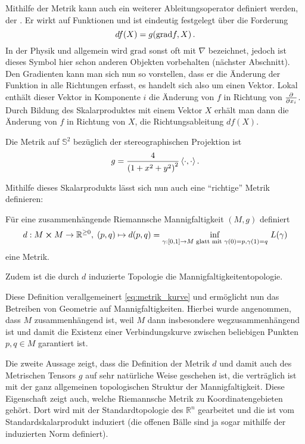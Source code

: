\documentclass[../H_Analysis_main.tex]{subfiles}
\begin{document}
\begin{bsp}[Gradient]
Mithilfe der Metrik kann auch ein weiterer Ableitungsoperator definiert werden, der . Er wirkt auf Funktionen und ist eindeutig festgelegt über die Forderung
\begin{equation}
df(X) = g\qty(\text{grad} f, X) \, .
\end{equation}
In der Physik und allgemein wird $\text{grad}$ sonst oft mit $\nabla$ bezeichnet, jedoch ist dieses Symbol hier schon anderen Objekten vorbehalten (nächster Abschnitt). Den Gradienten kann man sich nun so vorstellen, dass er die Änderung der Funktion in alle Richtungen erfasst, es handelt sich also um einen Vektor. Lokal enthält dieser Vektor in Komponente $i$ die Änderung von $f$ in Richtung von $\pdv{x_i}$. Durch Bildung des Skalarproduktes mit einem Vektor $X$ erhält man dann die Änderung von $f$ in Richtung von $X$, die Richtungsableitung $df(X)$.
\end{bsp}


\begin{bsp}[Sphäre]
Die Metrik auf $\mathbb{S}^2$ bezüglich der stereographischen Projektion ist
\begin{equation}
g = \frac{4}{\qty(1 + x^2 + y^2)^2} \, \langle \cdot, \cdot \rangle \, .
\end{equation}
\end{bsp}


Mithilfe dieses Skalarprodukts lässt sich nun auch eine \enquote{richtige} Metrik definieren:
\begin{satz}[Abstand]
Für eine zusammenhängende Riemannsche Mannigfaltigkeit $(M, g)$ definiert
\begin{equation}\label{eq:distance_curve}
d: M \cross M \rightarrow \mathbb{R}^{\geq 0}, \; (p, q) \mapsto d(p, q) = \inf_{\gamma: [0, 1] \rightarrow M \text{ glatt mit } \gamma(0) = p, \gamma(1) = q} \, L(\gamma)
\end{equation}
eine Metrik.

Zudem ist die durch $d$ induzierte Topologie die Mannigfaltigkeitentopologie.
\end{satz}
Diese Definition verallgemeinert \eqref{eq:metrik_kurve} und ermöglicht nun das Betreiben von Geometrie auf Mannigfaltigkeiten. Hierbei wurde angenommen, dass $M$ zusammenhängend ist, weil $M$ dann insbesondere wegzusammenhängend ist und damit die Existenz einer Verbindungskurve zwischen beliebigen Punkten $p, q \in M$ garantiert ist.

Die zweite Aussage zeigt, dass die Definition der Metrik $d$ und damit auch des Metrischen Tensors $g$ auf sehr natürliche Weise geschehen ist, die verträglich ist mit der ganz allgemeinen topologischen Struktur der Mannigfaltigkeit. Diese Eigenschaft zeigt auch, welche Riemannsche Metrik zu Koordinatengebieten gehört. Dort wird mit der Standardtopologie des $\mathbb{R}^n$ gearbeitet und die ist vom Standardskalarprodukt induziert (die offenen Bälle sind ja sogar mithilfe der induzierten Norm definiert).\\
\end{document}
